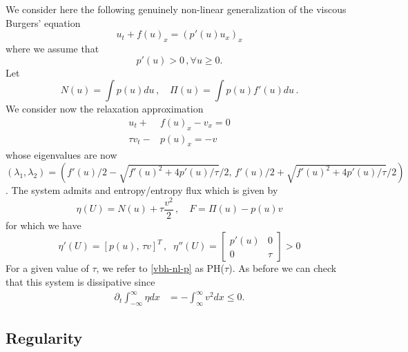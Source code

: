 \documentclass{article}
\theoremstyle{plain}
\theoremstyle{definition}
\numberwithin{theorem}{section}
\begin{document}
We consider here the following genuinely non-linear generalization of the viscous Burgers' equation
\begin{equation}\label{vbh-nl}
u_t + f(u)_x =  (p'(u) u_x)_x
\end{equation}
where we assume that 
\begin{equation}\label{vbh-nl-p}
p'(u) >0\,, \forall u\ge 0.
\end{equation}
Let 
\begin{equation}\label{vbh-nl1}
N(u) = \int p(u)  du\,,\quad
\Pi(u) = \int p(u)f'(u) du\,. 
\end{equation}
We consider now the relaxation approximation 
\begin{equation}\label{psys-nl1}
\begin{aligned}
u_t + &  f(u)_x - v_x =0\\
\tau v_t -& p(u)_x = -v
\end{aligned}
\end{equation}
whose eigenvalues are now $(\lambda_1,\lambda_2)=(f'(u)/2 - \sqrt{f'(u)^2  + 4 p'(u)/\tau}/2,\,f'(u)/2 + \sqrt{f'(u)^2  + 4 p'(u)/\tau}/2)$.
The system admits and entropy/entropy flux which is given by
$$
\eta(U) = N(u) +  \tau\dfrac{v^2}{2}\,,\quad
F = \Pi(u) - p(u)v
$$
for which we have 
$$
\eta'(U) =  [p(u),\,  \tau v]^T\,,\;\; \eta''(U) = \left[\begin{array}{cc}
p'(u)&  0\\
0 & \tau
\end{array}
\right]>0
$$
For a given value of $\tau$, we refer to \eqref{vbh-nl-p} as PH($\tau$). As before we can check that this system is dissipative since
\begin{align}
\partial_t \int_{-\infty}^\infty \eta dx & = -  \int_\infty^\infty v^2 dx \le 0.
\end{align}



\subsection{Regularity}
\end{document}
